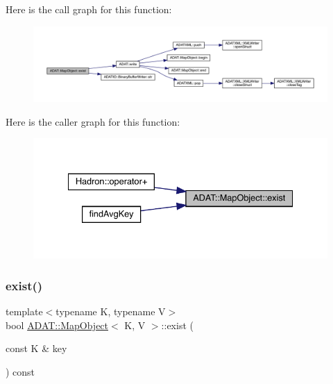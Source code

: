 Here is the call graph for this function\+:
\nopagebreak
\begin{figure}[H]
\begin{center}
\leavevmode
\includegraphics[width=350pt]{da/d29/classADAT_1_1MapObject_a1d22f979e34bda97c3dc89d5fc937d3b_cgraph}
\end{center}
\end{figure}
Here is the caller graph for this function\+:
\nopagebreak
\begin{figure}[H]
\begin{center}
\leavevmode
\includegraphics[width=334pt]{da/d29/classADAT_1_1MapObject_a1d22f979e34bda97c3dc89d5fc937d3b_icgraph}
\end{center}
\end{figure}
\mbox{\label{classADAT_1_1MapObject_a1d22f979e34bda97c3dc89d5fc937d3b}} 
\subsubsection{\texorpdfstring{exist()}{exist()}\hspace{0.1cm}{\footnotesize\ttfamily [2/3]}}
{\footnotesize\ttfamily template$<$typename K, typename V$>$ \\
bool \mbox{\hyperlink{classADAT_1_1MapObject}{A\+D\+A\+T\+::\+Map\+Object}}$<$ K, V $>$\+::exist (\begin{DoxyParamCaption}\item[{const K \&}]{key }\end{DoxyParamCaption}) const\hspace{0.3cm}{\ttfamily [inline]}}



